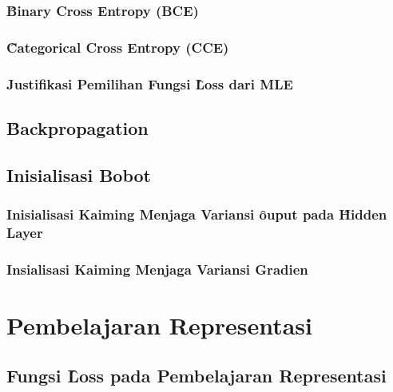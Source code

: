         \subsubsection{\f{Binary Cross Entropy} (BCE)}

        \subsubsection{\f{Categorical Cross Entropy} (CCE)}

        \subsubsection{Justifikasi Pemilihan Fungsi \f{Loss} dari MLE}

    \subsection{\f{Backpropagation}}

    \subsection{Inisialisasi Bobot}
        \subsubsection{Inisialisasi Kaiming Menjaga Variansi \f{ouput} pada \f{Hidden Layer}}

        \subsubsection{Insialisasi Kaiming Menjaga Variansi Gradien}



\section{Pembelajaran Representasi}

    \subsection{Fungsi \f{Loss} pada Pembelajaran Representasi}













        

